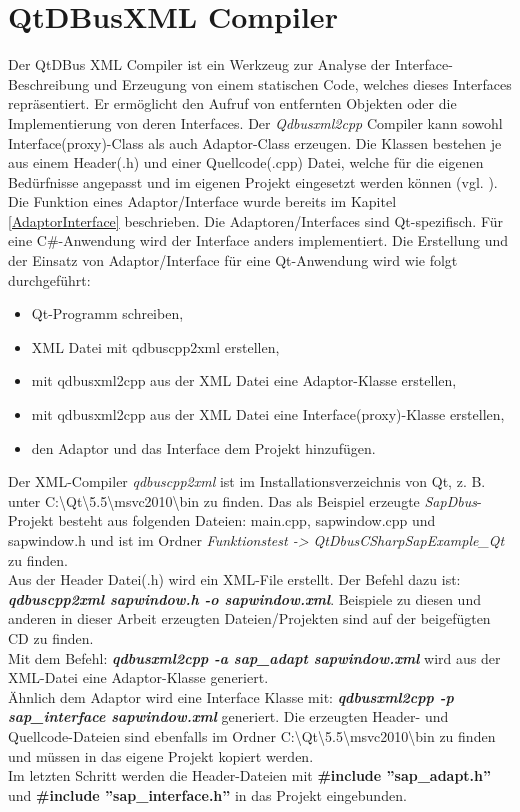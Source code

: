 \section{QtDBusXML Compiler}
Der QtDBus XML Compiler ist ein Werkzeug zur Analyse der Interface-Beschreibung und Erzeugung von einem statischen Code, welches dieses Interfaces repräsentiert. Er ermöglicht den Aufruf von entfernten Objekten oder die Implementierung von deren Interfaces. Der \textit{Qdbusxml2cpp} Compiler kann sowohl Interface(proxy)-Class als auch Adaptor-Class erzeugen. Die Klassen bestehen je aus einem Header(.h) und einer Quellcode(.cpp) Datei, welche für die eigenen Bedürfnisse angepasst und im eigenen Projekt eingesetzt werden können (vgl. \cite[Web]{Qt2015b}).\\
Die Funktion eines Adaptor/Interface wurde bereits im Kapitel \ref{AdaptorInterface} beschrieben. Die Adaptoren/Interfaces sind Qt-spezifisch. Für eine C\#-Anwendung wird der Interface anders implementiert. Die Erstellung und der Einsatz von Adaptor/Interface für eine Qt-Anwendung wird wie folgt durchgeführt:
\begin{itemize}
	\setlength{\itemsep}{-10pt}
	\item Qt-Programm schreiben,
	\item XML Datei mit qdbuscpp2xml erstellen,
	\item mit qdbusxml2cpp aus der XML Datei eine Adaptor-Klasse erstellen,
	\item mit qdbusxml2cpp aus der XML Datei eine Interface(proxy)-Klasse erstellen,
	\item den Adaptor und das Interface dem Projekt hinzufügen.
\end{itemize} 
Der XML-Compiler \textit{qdbuscpp2xml} ist im Installationsverzeichnis von Qt, z. B. unter C:\textbackslash Qt\textbackslash 5.5\textbackslash msvc2010\textbackslash bin zu finden. Das als Beispiel erzeugte \textit{SapDbus}-Projekt besteht aus folgenden Dateien: main.cpp, sapwindow.cpp und sapwindow.h und ist im Ordner \textit{Funktionstest -> QtDbusCSharpSapExample\_Qt} zu finden.\\
Aus der Header Datei(.h) wird ein XML-File erstellt. Der Befehl dazu ist: \textit{\textbf{\mbox{qdbuscpp2xml} sapwindow.h -o sapwindow.xml}}. Beispiele zu diesen und anderen in dieser Arbeit erzeugten Dateien/Projekten sind auf der beigefügten CD zu finden.\\
Mit dem Befehl: \textit{\textbf{qdbusxml2cpp -a sap\_adapt sapwindow.xml}} wird aus der XML-Datei eine Adaptor-Klasse generiert.\\
Ähnlich dem Adaptor wird eine Interface Klasse mit: \textit{\textbf{qdbusxml2cpp -p sap\_interface sapwindow.xml}} generiert. Die erzeugten Header- und Quellcode-Dateien sind ebenfalls im Ordner C:\textbackslash Qt\textbackslash 5.5\textbackslash msvc2010\textbackslash bin zu finden und müssen in das eigene Projekt kopiert werden.\\
Im letzten Schritt werden die Header-Dateien mit \textbf{\#include ''sap\_adapt.h''} und
\textbf{\#include ''sap\_interface.h''} in das Projekt eingebunden.  
